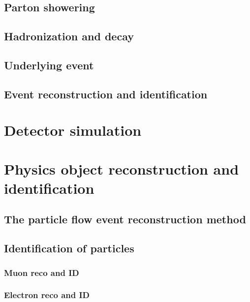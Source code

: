 \subsection{Parton showering}
\subsection{Hadronization and decay}
\subsection{Underlying event}
\subsection{Event reconstruction and identification}

\section{Detector simulation}
\section{Physics object reconstruction and identification}
\subsection{The particle flow event reconstruction method}
\subsection{Identification of particles}
\subsubsection{Muon reco and ID}
\subsubsection{Electron reco and ID}
